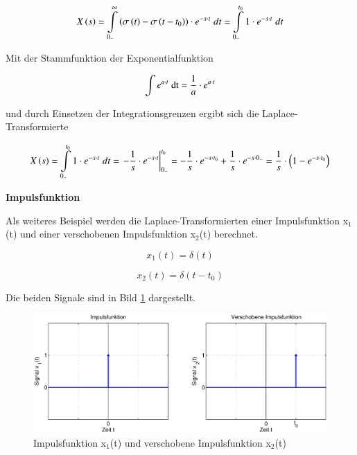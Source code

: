 \begin{equation}\label{eq:foursix}
X\left(s\right)=\int\limits _{0_{-} }^{\infty }\left(\sigma \left(t\right)-\sigma \left(t-t_{0} \right)\right)\cdot e^{-s\cdot t} {\rm \; } dt=\int\limits _{0_{-} }^{t_{0} }1\cdot e^{-s\cdot t} {\rm \; } dt
\end{equation}

\noindent Mit der Stammfunktion der Exponentialfunktion

\begin{equation}\label{eq:fourseven}
\int\limits e^{a\cdot t} {\rm \; dt} =\frac{1}{a} \cdot e^{a\cdot t}
\end{equation}

\noindent und durch Einsetzen der Integrationsgrenzen ergibt sich die Laplace-Transformierte

\begin{equation}\label{eq:foureight}
X\left(s\right)=\int\limits _{0_{-} }^{t_{0} }1\cdot e^{-s\cdot t} {\rm \; } dt=\left. -\frac{1}{s} \cdot e^{-s\cdot t} \right|_{0_{-} }^{t_{0} } =-\frac{1}{s} \cdot e^{-s\cdot t_{0} } +\frac{1}{s} \cdot e^{-s\cdot 0_{-} } =\frac{1}{s} \cdot \left(1-e^{-s\cdot t_{0} } \right)
\end{equation}
\medskip

{\selectfont
\noindent\textbf{Impulsfunktion}}\smallskip

\noindent Als weiteres Beispiel werden die Laplace-Transformierten einer Impulsfunktion x$_{1}$(t) und einer verschobenen Impulsfunktion x$_{2}$(t) berechnet. 

\begin{equation}\label{eq:fournine}
x_{1} \left(t\right)=\delta \left(t\right)
\end{equation}

\begin{equation}\label{eq:fourten}
x_{2} \left(t\right)=\delta \left(t-t_{0} \right)
\end{equation}

\noindent Die beiden Signale sind in Bild \ref{fig:LaplaceSignaleImpuls} dargestellt.

\begin{figure}[H]
  \centerline{\includegraphics[width=1\textwidth]{Kapitel3/Bilder/image2}}
  \caption{Impulsfunktion x$_{1}$(t) und verschobene Impulsfunktion x$_{2}$(t)}
  \label{fig:LaplaceSignaleImpuls}
\end{figure}


